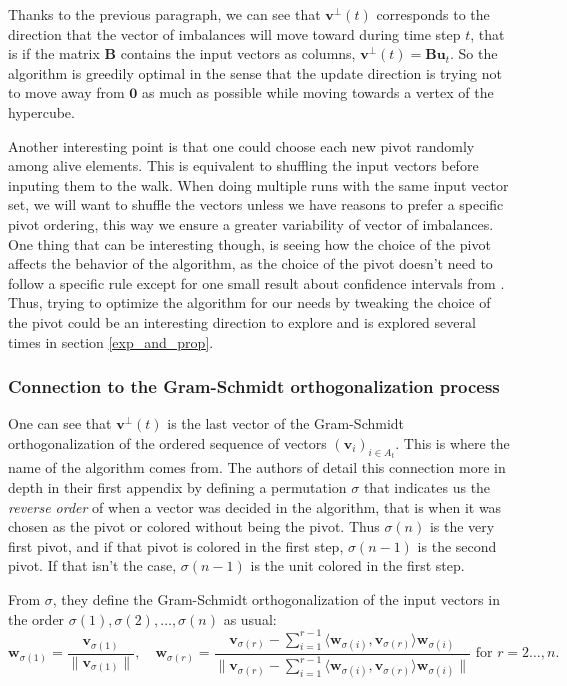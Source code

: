 \documentclass[12pt]{article}
\begin{document}
Thanks to the previous paragraph, we can see that $\textbf{v}^\perp(t)$ corresponds to the direction that the vector of imbalances will move toward during time step $t$, that is if the matrix $\textbf{B}$ contains the input vectors as columns, $\textbf{v}^\perp(t) = \textbf{Bu}_t$. So the algorithm is greedily optimal in the sense that the update direction is trying not to move away from $\textbf{0}$ as much as possible while moving towards a vertex of the hypercube.

Another interesting point is that one could choose each new pivot randomly among alive elements. This is equivalent to shuffling the input vectors before inputing them to the walk. When doing multiple runs with the same input vector set, we will want to shuffle the vectors unless we have reasons to prefer a specific pivot ordering, this way we ensure a greater variability of vector of imbalances. One thing that can be interesting though, is seeing how the choice of the pivot affects the behavior of the algorithm, as the choice of the pivot doesn't need to follow a specific rule except for one small result about confidence intervals from \cite{harshaw2019balancing}. Thus, trying to optimize the algorithm for our needs by tweaking the choice of the pivot could be an interesting direction to explore and is explored several times in section \ref{exp_and_prop}.

\subsubsection{Connection to the Gram-Schmidt orthogonalization process}

One can see that $\textbf{v}^\perp (t)$ is the last vector of the Gram-Schmidt orthogonalization of the ordered sequence of vectors $(\textbf{v}_i)_{i\in A_t}$. This is where the name of the algorithm comes from. The authors of \cite{harshaw2019balancing} detail this connection more in depth in their first appendix by defining a permutation $\sigma$ that indicates us the \textit{reverse order} of when a vector was decided in the algorithm, that is when it was chosen as the pivot or colored without being the pivot. Thus $\sigma(n)$ is the very first pivot, and if that pivot is colored in the first step, $\sigma(n-1)$ is the second pivot. If that isn't the case, $\sigma(n-1)$ is the unit colored in the first step. 

From $\sigma$, they define the Gram-Schmidt orthogonalization of the input vectors in the order $\sigma(1),\sigma(2),\dots,\sigma(n)$ as usual: $$ \textbf{w}_{\sigma(1)}=\frac{\textbf{v}_{\sigma(1)}}{\|\textbf{v}_{\sigma(1)}\|},\quad\textbf{w}_{\sigma(r)}=\frac{\textbf{v}_{\sigma(r)}-\sum_{i=1}^{r-1}\langle\textbf{w}_{\sigma(i)},\textbf{v}_{\sigma(r)}\rangle\textbf{w}_{\sigma(i)}}{\|\textbf{v}_{\sigma(r)}-\sum_{i=1}^{r-1}\langle\textbf{w}_{\sigma(i)},\textbf{v}_{\sigma(r)}\rangle\textbf{w}_{\sigma(i)}\|}\textrm{ for }r=2\dots,n.$$
\end{document}
